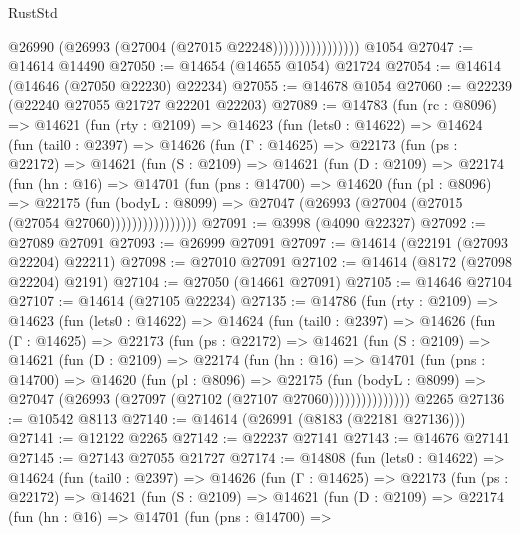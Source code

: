 \begin{lexlean}{RustStd}
\begin{coremodule}
                            @26990 (@26993 (@27004 (@27015 @22248))))))))))))))))
    @1054
@27047 := @14614 @14490
@27050 := @14654 (@14655 @1054) @21724
@27054 := @14614 (@14646 (@27050 @22230) @22234)
@27055 := @14678 @1054
@27060 := @22239 (@22240 @27055 @21727 @22201 @22203)
@27089 := @14783
    (fun (rc : @8096) =>
    @14621
      (fun (rty : @2109) =>
      @14623
        (fun (lets0 : @14622) =>
        @14624
          (fun (tail0 : @2397) =>
          @14626
            (fun (Γ : @14625) =>
            @22173
              (fun (ps : @22172) =>
              @14621
                (fun (S : @2109) =>
                @14621
                  (fun (D : @2109) =>
                  @22174
                    (fun (hn : @16) =>
                    @14701
                      (fun (pns : @14700) =>
                      @14620
                        (fun (pl : @8096) =>
                        @22175
                          (fun (bodyL : @8099) =>
                          @27047 (@26993 (@27004 (@27015 (@27054 @27060))))))))))))))))
@27091 := @3998 (@4090 @22327)
@27092 := @27089 @27091
@27093 := @26999 @27091
@27097 := @14614 (@22191 (@27093 @22204) @22211)
@27098 := @27010 @27091
@27102 := @14614 (@8172 (@27098 @22204) @2191)
@27104 := @27050 (@14661 @27091)
@27105 := @14646 @27104
@27107 := @14614 (@27105 @22234)
@27135 := @14786
    (fun (rty : @2109) =>
    @14623
      (fun (lets0 : @14622) =>
      @14624
        (fun (tail0 : @2397) =>
        @14626
          (fun (Γ : @14625) =>
          @22173
            (fun (ps : @22172) =>
            @14621
              (fun (S : @2109) =>
              @14621
                (fun (D : @2109) =>
                @22174
                  (fun (hn : @16) =>
                  @14701
                    (fun (pns : @14700) =>
                    @14620
                      (fun (pl : @8096) =>
                      @22175
                        (fun (bodyL : @8099) =>
                        @27047 (@26993 (@27097 (@27102 (@27107 @27060)))))))))))))))
    @2265
@27136 := @10542 @8113
@27140 := @14614 (@26991 (@8183 (@22181 @27136)))
@27141 := @12122 @2265
@27142 := @22237 @27141
@27143 := @14676 @27141
@27145 := @27143 @27055 @21727
@27174 := @14808
    (fun (lets0 : @14622) =>
    @14624
      (fun (tail0 : @2397) =>
      @14626
        (fun (Γ : @14625) =>
        @22173
          (fun (ps : @22172) =>
          @14621
            (fun (S : @2109) =>
            @14621
              (fun (D : @2109) =>
              @22174
                (fun (hn : @16) =>
                @14701
                  (fun (pns : @14700) =>

\end{coremodule}
\end{lexlean}
